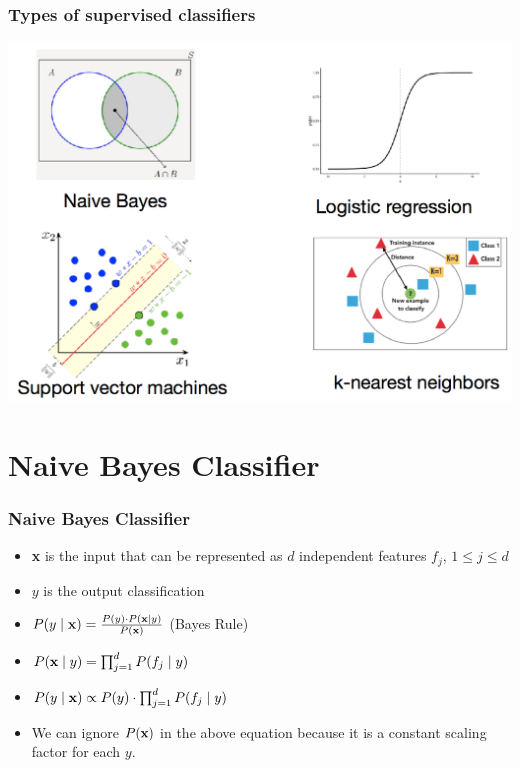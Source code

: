 \begin{frame}
\frametitle{Types of supervised classifiers}
\includegraphics[scale=0.27]{figures/classifiers/supervised.png}
\end{frame}

\section{Naive Bayes Classifier}
\frame{\tableofcontents[currentsection]}

\begin{frame}
\frametitle{Naive Bayes Classifier}
\begin{itemize}[<+->]
\item \textbf{x} is the input that can be represented as $d$ independent features $f_j$, $1 \leq j \leq d$
\item $y$ is the output classification
\item $P(y \mid {\bf x}) = \frac{P(y) \cdot P({\bf x} \mid y)}{P({\bf x})}$ (Bayes Rule)
\item $P({\bf x} \mid y) = \prod_{j=1}^{d} P(f_j  \mid y)$
\item $P(y \mid {\bf x}) \propto P(y) \cdot  \prod_{j=1}^{d} P(f_j  \mid y) $
\item We can ignore $P({\bf x})$ in the above equation because it is a constant scaling factor for each $y$.
\end{itemize}
\end{frame}

